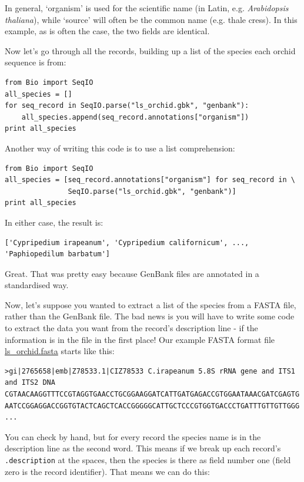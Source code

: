 \documentclass{report}
\begin{document}
In general, `organism' is used for the scientific name (in Latin, e.g. \textit{Arabidopsis thaliana}),
while `source' will often be the common name (e.g. thale cress).  In this example, as is often the case,
the two fields are identical.  

Now let's go through all the records, building up a list of the species each orchid sequence is from:

\begin{verbatim}
from Bio import SeqIO
all_species = []
for seq_record in SeqIO.parse("ls_orchid.gbk", "genbank"):
    all_species.append(seq_record.annotations["organism"])
print all_species
\end{verbatim}

Another way of writing this code is to use a list comprehension:

\begin{verbatim}
from Bio import SeqIO
all_species = [seq_record.annotations["organism"] for seq_record in \
               SeqIO.parse("ls_orchid.gbk", "genbank")]
print all_species
\end{verbatim}

\noindent In either case, the result is:

\begin{verbatim}
['Cypripedium irapeanum', 'Cypripedium californicum', ..., 'Paphiopedilum barbatum']
\end{verbatim}

Great.  That was pretty easy because GenBank files are annotated in a standardised way.

Now, let's suppose you wanted to extract a list of the species from a FASTA file, rather than the GenBank file.  The bad news is you will have to write some code to extract the data you want from the record's description line - if the information is in the file in the first place!  Our example FASTA format file \href{http://biopython.org/DIST/docs/tutorial/examples/ls_orchid.fasta}{ls\_orchid.fasta} starts like this:

\begin{verbatim}
>gi|2765658|emb|Z78533.1|CIZ78533 C.irapeanum 5.8S rRNA gene and ITS1 and ITS2 DNA
CGTAACAAGGTTTCCGTAGGTGAACCTGCGGAAGGATCATTGATGAGACCGTGGAATAAACGATCGAGTG
AATCCGGAGGACCGGTGTACTCAGCTCACCGGGGGCATTGCTCCCGTGGTGACCCTGATTTGTTGTTGGG
...
\end{verbatim}

You can check by hand, but for every record the species name is in the description line as the second word.  This means if we break up each record's \verb|.description| at the spaces, then the species is there as field number one (field zero is the record identifier).  That means we can do this:
\end{document}
